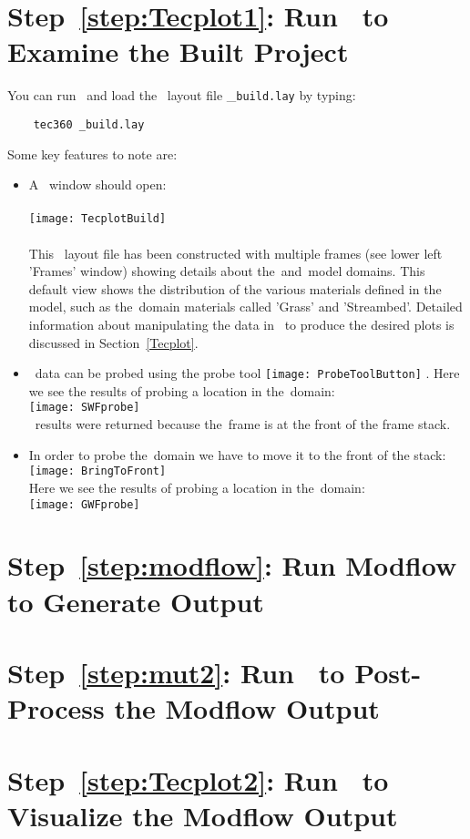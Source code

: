 \section*{Step~\ref{step:Tecplot1}: Run \tecplot\ to Examine the Built Project}
You can run \tecplot\ and load the \tecplot\ layout file \_\verb+build.lay+ by typing:
\begin{verbatim}
    tec360 _build.lay
\end{verbatim}
Some key features to note are:
\begin{itemize}
    \item A \tecplot\ window should open: \\ \\
        \texttt{[image: TecplotBuild]} \\ \\
    This \tecplot\ layout file has been constructed with multiple frames (see lower left 'Frames' window) showing details about the\swf\ and\gwf\ model domains. This default view shows the distribution of the various materials defined in the model, such as the\swf\ domain materials called 'Grass' and 'Streambed'.  Detailed information about manipulating the data in \tecplot\ to produce the desired plots is discussed in Section~\ref{Tecplot}.
    \item \tecplot\ data can be probed using the probe tool \texttt{[image: ProbeToolButton]} .  Here we see the results of probing a location in the\swf\ domain: \\
        \texttt{[image: SWFprobe]} \\
       \swf\ results were returned because the\swf\ frame is at the front of the frame stack.
    \item In order to probe the\gwf\ domain we have to move it to the front of the stack: \\
            \texttt{[image: BringToFront]} \\
          Here we see the results of probing a location in the\gwf\ domain: \\
            \texttt{[image: GWFprobe]} \\

\end{itemize}



\section*{Step~\ref{step:modflow}: Run Modflow to Generate Output}
\section*{Step~\ref{step:mut2}: Run \mut\ to Post-Process the Modflow Output}
\section*{Step~\ref{step:Tecplot2}: Run \tecplot\ to Visualize the Modflow Output}

